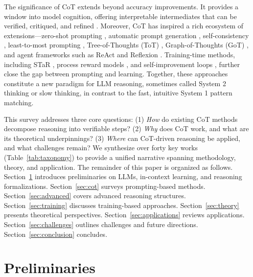 \documentclass[11pt,a4paper]{article}
\begin{document}
The significance of CoT extends beyond accuracy improvements. It provides a window into model cognition, offering interpretable intermediates that can be verified, critiqued, and refined \citep{lightman2023let}. Moreover, CoT has inspired a rich ecosystem of extensions---zero-shot prompting \citep{kojima2022large}, automatic prompt generation \citep{zhang2022automatic}, self-consistency \citep{wang2022self}, least-to-most prompting \citep{zhou2022least}, Tree-of-Thoughts (ToT) \citep{yao2023tree}, Graph-of-Thoughts (GoT) \citep{besta2024graph}, and agent frameworks such as ReAct \citep{yao2023react} and Reflexion \citep{shinn2023reflexion}. Training-time methods, including STaR \citep{zelikman2022star}, process reward models \citep{uesato2022solving}, and self-improvement loops \citep{huang2022large}, further close the gap between prompting and learning. Together, these approaches constitute a new paradigm for LLM reasoning, sometimes called System 2 thinking \citep{kahneman2011thinking} or slow thinking, in contrast to the fast, intuitive System 1 pattern matching.

This survey addresses three core questions: (1) \textit{How} do existing CoT methods decompose reasoning into verifiable steps? (2) \textit{Why} does CoT work, and what are its theoretical underpinnings? (3) \textit{Where} can CoT-driven reasoning be applied, and what challenges remain? We synthesize over forty key works (Table~\ref{tab:taxonomy}) to provide a unified narrative spanning methodology, theory, and application. The remainder of this paper is organized as follows. Section~\ref{sec:prelim} introduces preliminaries on LLMs, in-context learning, and reasoning formalizations. Section~\ref{sec:cot} surveys prompting-based methods. Section~\ref{sec:advanced} covers advanced reasoning structures. Section~\ref{sec:training} discusses training-based approaches. Section~\ref{sec:theory} presents theoretical perspectives. Section~\ref{sec:applications} reviews applications. Section~\ref{sec:challenges} outlines challenges and future directions. Section~\ref{sec:conclusion} concludes.

\section{Preliminaries}
\label{sec:prelim}
\end{document}
